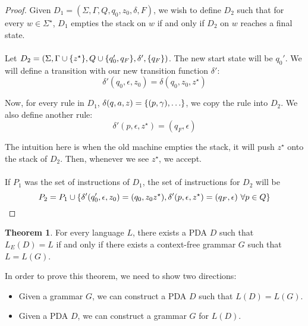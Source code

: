 \documentclass[]{article}
\DeclarePairedDelimiter{\set}{\lbrace}{\rbrace}
\theoremstyle{definition}
\newtheorem*{theorem}{Theorem}
\begin{document}
        \begin{proof}
          Given $D_1 = (\Sigma, \Gamma, Q, q_0, z_0, \delta, F)$, we wish to define $D_2$ such that for every $w \in \Sigma^\star$, $D_1$ empties the stack on $w$ if and only if $D_2$ on $w$ reaches a final state.
          \\ \\
          Let $D_2 = (\Sigma, \Gamma \cup \set{z^\star}, Q \cup \set{q_0', q_F}, \delta', \set{q_F})$. The new start state will be $q_0'$. We will define a transition with our new transition function $\delta'$:
          $$
            \delta'(q_0, \epsilon, z_0) = \delta(q_0, z_0, z^\star)
          $$

          Now, for every rule in $D_1$, $\delta(q, a, z) = \set{ (p, \gamma), \ldots }$, we copy the rule into $D_2$. We also define another rule:
          $$
            \delta'(p, \epsilon, z^\star) = (q_F, \epsilon)
          $$

          The intuition here is when the old machine empties the stack, it will push $z^\star$ onto the stack of $D_2$. Then, whenever we see $z^\star$, we accept.
          \\ \\
          If $P_1$ was the set of instructions of $D_1$, the set of instructions for $D_2$ will be
          $$
            P_2 = P_1 \cup \set{ \delta'(q_0', \epsilon, z_0) = (q_0, z_0z^\star), \delta'(p, \epsilon, z^\star) = (q_F, \epsilon) ~\forall p \in Q}
          $$
        \end{proof}

        \begin{theorem}
          For every language $L$, there exists a PDA $D$ such that $L_E(D) = L$ if and only if there exists a context-free grammar $G$ such that $L = L(G)$.
        \end{theorem}

        In order to prove this theorem, we need to show two directions:
        \begin{itemize}
          \item Given a grammar $G$, we can construct a PDA $D$ such that $L(D) = L(G)$.
          \item Given a PDA $D$, we can construct a grammar $G$ for $L(D)$.
        \end{itemize}
\end{document}
